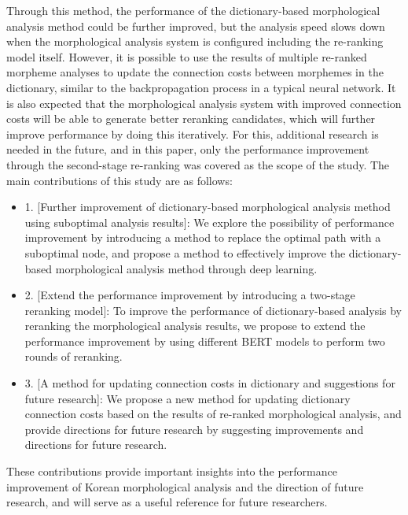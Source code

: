 \documentclass[AMS,STIX2COL]{WileyNJD-v2}
\begin{document}
    Through this method, the performance of the dictionary-based morphological analysis method could be further improved, but the analysis speed slows down when the morphological analysis system is configured including the re-ranking model itself.
    However, it is possible to use the results of multiple re-ranked morpheme analyses to update the connection costs between morphemes in the dictionary, similar to the backpropagation process in a typical neural network.
    It is also expected that the morphological analysis system with improved connection costs will be able to generate better reranking candidates, which will further improve performance by doing this iteratively.
    For this, additional research is needed in the future, and in this paper, only the performance improvement through the second-stage re-ranking was covered as the scope of the study.
    The main contributions of this study are as follows:
    \begin{itemize}
        \item 1. [Further improvement of dictionary-based morphological analysis method using suboptimal analysis results]: We explore the possibility of performance improvement by introducing a method to replace the optimal path with a suboptimal node, and propose a method to effectively improve the dictionary-based morphological analysis method through deep learning.
        \item 2. [Extend the performance improvement by introducing a two-stage reranking model]: To improve the performance of dictionary-based analysis by reranking the morphological analysis results, we propose to extend the performance improvement by using different BERT models to perform two rounds of reranking.
        \item 3. [A method for updating connection costs in dictionary and suggestions for future research]: We propose a new method for updating dictionary connection costs based on the results of re-ranked morphological analysis, and provide directions for future research by suggesting improvements and directions for future research.
    \end{itemize}
    These contributions provide important insights into the performance improvement of Korean morphological analysis and the direction of future research, and will serve as a useful reference for future researchers.
\end{document}

